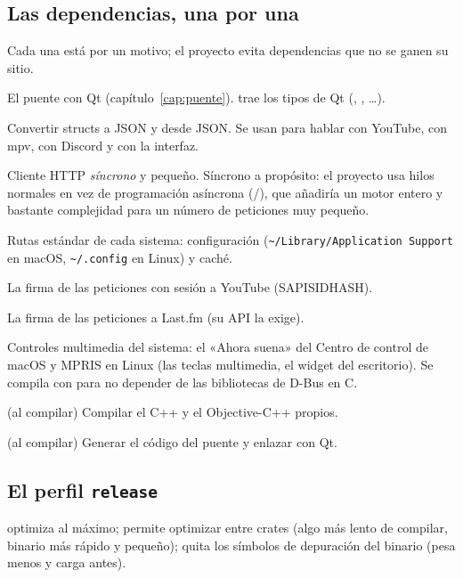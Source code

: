 \subsection{Las dependencias, una por una}

Cada una está por un motivo; el proyecto evita dependencias que no se ganen su sitio.

\begin{description}[leftmargin=1.2em]
  \item[\cod{cxx}, \cod{cxx-qt}, \cod{cxx-qt-lib}] El puente con Qt
  (capítulo~\ref{cap:puente}).  trae los tipos de Qt (,
  , …).
  \item[\cod{serde}, \cod{serde_json}] Convertir structs a JSON y desde JSON. Se usan para hablar
  con YouTube, con mpv, con Discord y con la interfaz.
  \item[\cod{ureq}] Cliente HTTP \emph{síncrono} y pequeño. Síncrono a propósito: el proyecto
  usa hilos normales en vez de programación asíncrona (/), que añadiría un
  motor entero y bastante complejidad para un número de peticiones muy pequeño.
  \item[\cod{dirs}] Rutas estándar de cada sistema: configuración
  (\texttt{\textasciitilde/Library/Application Support} en macOS, \texttt{\textasciitilde/.config}
  en Linux) y caché.
  \item[\cod{sha1}] La firma de las peticiones con sesión a YouTube (SAPISIDHASH).
  \item[\cod{md5}] La firma de las peticiones a Last.fm (su API la exige).
  \item[\cod{souvlaki}] Controles multimedia del sistema: el «Ahora suena» del Centro de
  control de macOS y MPRIS en Linux (las teclas multimedia, el widget del escritorio). Se
  compila con  para no depender de las bibliotecas de D-Bus en C.
  \item[\cod{cc}] (al compilar) Compilar el C++ y el Objective-C++ propios.
  \item[\cod{cxx-qt-build}] (al compilar) Generar el código del puente y enlazar con Qt.
\end{description}

\subsection{El perfil \texttt{release}}

 optimiza al máximo;  permite optimizar entre crates (algo
más lento de compilar, binario más rápido y pequeño);  quita los símbolos de
depuración del binario (pesa menos y carga antes).

